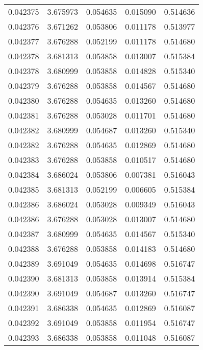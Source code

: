 \begin{tabular}{lrrrr}
0.042375    &  3.675973 &  0.054635 &  0.015090 &             0.514636 \\
0.042376    &  3.671262 &  0.053806 &  0.011178 &             0.513977 \\
0.042377    &  3.676288 &  0.052199 &  0.011178 &             0.514680 \\
0.042378    &  3.681313 &  0.053858 &  0.013007 &             0.515384 \\
0.042378    &  3.680999 &  0.053858 &  0.014828 &             0.515340 \\
0.042379    &  3.676288 &  0.053858 &  0.014567 &             0.514680 \\
0.042380    &  3.676288 &  0.054635 &  0.013260 &             0.514680 \\
0.042381    &  3.676288 &  0.053028 &  0.011701 &             0.514680 \\
0.042382    &  3.680999 &  0.054687 &  0.013260 &             0.515340 \\
0.042382    &  3.676288 &  0.054635 &  0.012869 &             0.514680 \\
0.042383    &  3.676288 &  0.053858 &  0.010517 &             0.514680 \\
0.042384    &  3.686024 &  0.053806 &  0.007381 &             0.516043 \\
0.042385    &  3.681313 &  0.052199 &  0.006605 &             0.515384 \\
0.042386    &  3.686024 &  0.053028 &  0.009349 &             0.516043 \\
0.042386    &  3.676288 &  0.053028 &  0.013007 &             0.514680 \\
0.042387    &  3.680999 &  0.054635 &  0.014567 &             0.515340 \\
0.042388    &  3.676288 &  0.053858 &  0.014183 &             0.514680 \\
0.042389    &  3.691049 &  0.054635 &  0.014698 &             0.516747 \\
0.042390    &  3.681313 &  0.053858 &  0.013914 &             0.515384 \\
0.042390    &  3.691049 &  0.054687 &  0.013260 &             0.516747 \\
0.042391    &  3.686338 &  0.054635 &  0.012869 &             0.516087 \\
0.042392    &  3.691049 &  0.053858 &  0.011954 &             0.516747 \\
0.042393    &  3.686338 &  0.053858 &  0.011048 &             0.516087 \\

\end{tabular}
